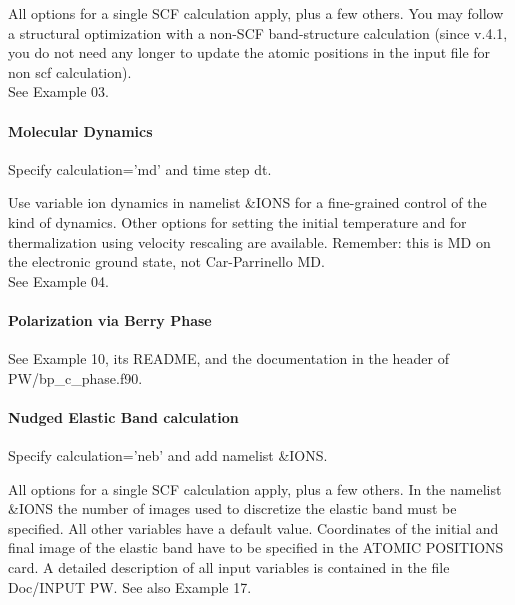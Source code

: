 \documentclass[12pt,a4paper]{article}
\begin{document}
All options for a single SCF calculation apply, plus a few others. You
may follow a structural optimization with a non-SCF band-structure
calculation (since v.4.1, you do not need any longer to update the 
atomic positions in the input file for non scf calculation).\\
See Example 03.

\paragraph{Molecular Dynamics} 
Specify calculation='md' and time step dt.

Use variable ion dynamics in namelist \&IONS for a fine-grained control
of the kind of dynamics. Other options for setting the initial
temperature and for thermalization using velocity rescaling are
available. Remember: this is MD on the electronic ground state, not
Car-Parrinello MD.\\
See Example 04.

\paragraph{Polarization via Berry Phase}
See Example 10, its README, and the documentation in the header of
PW/bp\_c\_phase.f90. 

\paragraph{Nudged Elastic Band calculation}
Specify calculation='neb' and add namelist \&IONS.

All options for a single SCF calculation apply, plus a few others. In the
namelist \&IONS the number of images used to discretize the elastic band
must be specified. All other variables have a default value. Coordinates
of the initial and final image of the elastic band have to be specified
in the ATOMIC POSITIONS card. A detailed description of all input
variables is contained in the file Doc/INPUT PW. See also Example 17.
\end{document}
